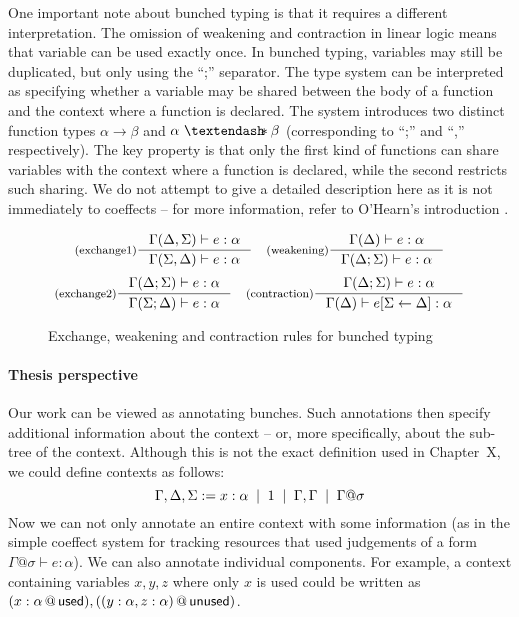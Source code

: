 One important note about bunched typing is that it requires a different interpretation. The omission
of weakening and contraction in linear logic means that variable can be used exactly once. 
In bunched typing, variables may still be duplicated, but only using the ``;'' separator.
The type system can be interpreted as specifying whether a variable may be shared between the 
body of a function and the context where a function is declared. The system introduces two 
distinct function types $\alpha \rightarrow \beta$ and $\alpha~ \textendash\!\!\!\ast \beta$
(corresponding to ``;'' and ``,'' respectively). The key property is that only the first kind
of functions can share variables with the context where a function is declared, while the second
restricts such sharing. We do not attempt to give a detailed description here as it is not 
immediately to coeffects -- for more information, refer to O'Hearn's introduction 
\cite{substruct-bunched}.

\begin{figure}
\begin{equation*}
\inference[(exchange1)]
  {\Gamma(\Delta, \Sigma) \vdash e : \alpha}
  {\Gamma(\Sigma, \Delta) \vdash e : \alpha}
\quad
\inference[(weakening)]
  {\Gamma(\Delta) \vdash e : \alpha}
  {\Gamma(\Delta; \Sigma) \vdash e : \alpha}
\end{equation*}
\begin{equation*}
\inference[(exchange2)]
  {\Gamma(\Delta; \Sigma) \vdash e : \alpha}
  {\Gamma(\Sigma; \Delta) \vdash e : \alpha}
\quad
\inference[(contraction)]
  {\Gamma(\Delta; \Sigma) \vdash e : \alpha}
  {\Gamma(\Delta) \vdash \subst{e}{\Sigma}{\Delta} : \alpha}
\end{equation*}
\caption{Exchange, weakening and contraction rules for bunched typing}
\label{fig:substructural-bunched}
\end{figure}


\paragraph{Thesis perspective}

Our work can be viewed as annotating bunches. Such annotations then specify additional information
about the context -- or, more specifically, about the sub-tree of the context. Although this is not
the exact definition used in Chapter~X, we could define contexts as follows:
%
\begin{equation*}
\Gamma, \Delta, \Sigma := x:\alpha \;\; | \;\; 1 \;\; | \;\; \Gamma, \Gamma \;\; | \;\; \Gamma @ \sigma
\end{equation*}
%
Now we can not only annotate an entire context with some information (as in the simple coeffect
system for tracking resources that used judgements of a form $\Gamma @ \sigma \vdash e : \alpha$).
We can also annotate individual components. For example, a context containing variables $x,y,z$
where only $x$ is used could be written as $(x:\alpha \,@\, \textnormal{\sffamily used}), ((y:\alpha, z:\alpha) 
\,@\, \textnormal{\sffamily unused})$.

